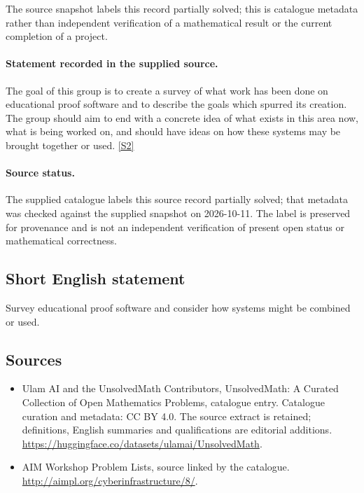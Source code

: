 \documentclass[11pt]{article}
\begin{document}
The source snapshot labels this record partially solved; this is catalogue metadata rather than independent verification of a mathematical result or the current completion of a project.
\paragraph{Statement recorded in the supplied source.}
The goal of this group is to create a survey of what work has been done on educational proof software and to describe the goals which spurred its creation. The group should aim to end with a concrete idea of what exists in this area now, what is being worked on, and should have ideas on how these systems may be brought together or used. \href{http://aimpl.org/cyberinfrastructure/8/}{[S2]}
\paragraph{Source status.}
The supplied catalogue labels this source record partially solved; that metadata was checked against the supplied snapshot on 2026-10-11. The label is preserved for provenance and is not an independent verification of present open status or mathematical correctness.
\subsection{Short English statement}
Survey educational proof software and consider how systems might be combined or used.
\subsection{Sources}
\begin{itemize}
\item[S1] Ulam AI and the UnsolvedMath Contributors, UnsolvedMath: A Curated Collection of Open Mathematics Problems, catalogue entry. Catalogue curation and metadata: CC BY 4.0. The source extract is retained; definitions, English summaries and qualifications are editorial additions.
\url{https://huggingface.co/datasets/ulamai/UnsolvedMath}.
\item[S2] AIM Workshop Problem Lists, source linked by the catalogue.
\url{http://aimpl.org/cyberinfrastructure/8/}.
\end{itemize}
\end{document}
